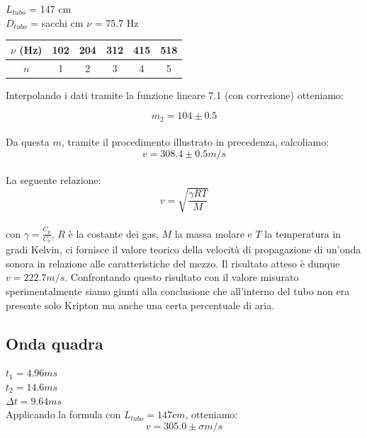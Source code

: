 $L_{tubo}$ = 147 cm\\
$D_{tubo}$ = sacchi cm
$\nu$ = 75.7 Hz
 


\begin{center}
\begin{tabular}{c|c|c|c|c|c}
$\nu$ (Hz) & 102 & 204 & 312 & 415 & 518 \\
\midrule
$n$ & 1 & 2 & 3 & 4 & 5\\
\end{tabular}
\end{center}

Interpolando i dati tramite la funzione lineare 7.1 (con correzione) otteniamo:

$$ m_2 = 104 \pm 0.5  $$ 
\\
Da questa $m$, tramite il procedimento illustrato in precedenza, calcoliamo: 
$$v = 308.4\pm0.5 m/s $$
\\
La seguente relazione:
$$v=\sqrt{\frac{\gamma RT}{M}}$$
\\
con $\gamma = \frac{C_p}{C_v}$, $R$ è la costante dei gas, $M$ la massa molare e $T$ la temperatura in gradi Kelvin, ci fornisce il valore teorico della velocità di propagazione di un'onda sonora in relazione alle caratteristiche del mezzo. 
Il risultato atteso è dunque $v=222.7 m/s$. Confrontando questo risultato con il valore misurato sperimentalmente siamo giunti alla conclusione che all'interno del tubo non era presente solo Kripton ma anche una certa percentuale di aria.

\subsection{Onda quadra}
$t_1 = 4.96 ms $\\
$t_2 = 14.6 ms $\\
$\Delta t = 9.64 ms $ \\
Applicando la formula  con $L_{tubo} = 147 cm$, otteniamo:
$$ v = 305.0 \pm \sigma m/s $$ 


